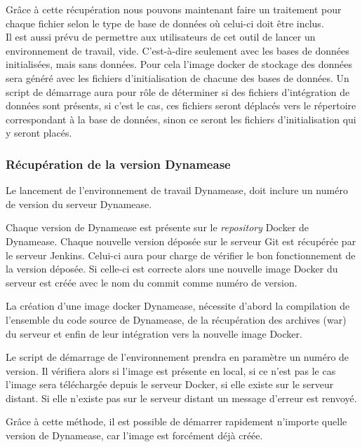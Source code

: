 Grâce à cette récupération nous pouvons maintenant faire un traitement pour chaque fichier selon le type de base de données où celui-ci doit être inclus.\\

Il est aussi prévu de permettre aux utilisateurs de cet outil de lancer un environnement de travail, vide. C'est-à-dire seulement avec les bases de données initialisées, mais sans données. Pour cela l'image docker de stockage des données sera généré avec les fichiers d'initialisation de chacune des bases de données. Un script de démarrage aura pour rôle de déterminer si des fichiers d'intégration de données sont présents, si c'est le cas, ces fichiers seront déplacés vers le répertoire correspondant à la base de données, sinon ce seront les fichiers d'initialisation qui y seront placés. 

\subsubsection{Récupération de la version Dynamease}

Le lancement de l'environnement de travail Dynamease, doit inclure un numéro de version du serveur Dynamease. 

Chaque version de Dynamease est présente sur le \textit{repository} Docker de Dynamease. Chaque nouvelle version déposée sur le serveur Git est récupérée par le serveur Jenkins. Celui-ci aura pour charge de vérifier le bon fonctionnement de la version déposée. Si celle-ci est correcte alors une nouvelle image Docker du serveur est créée avec le nom du commit comme numéro de version.

La création d'une image docker Dynamease, nécessite d'abord la compilation de l'ensemble du code source de Dynamease, de la récupération des archives (war) du serveur et enfin de leur intégration vers la nouvelle image Docker.

Le script de démarrage de l'environnement prendra en paramètre un numéro de version. Il vérifiera alors si l'image est présente en local, si ce n'est pas le cas l'image sera téléchargée depuis le serveur Docker, si elle existe sur le serveur distant. Si elle n'existe pas sur le serveur distant un message d'erreur est renvoyé.

Grâce à cette méthode, il est possible de démarrer rapidement n'importe quelle version de Dynamease, car l'image est forcément déjà créée.

